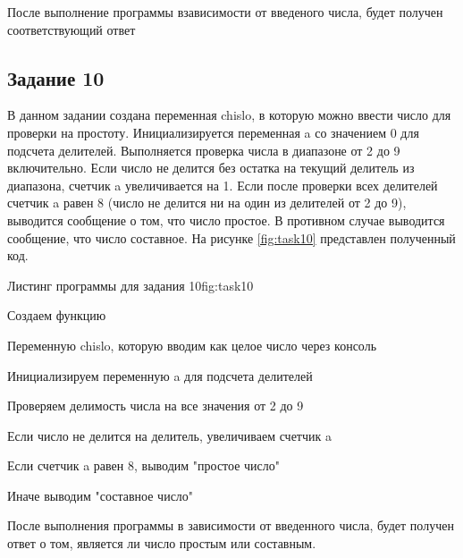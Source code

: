 \documentclass{vvsu}
\begin{document}
После выполнение программы взависимости от введеного числа, будет получен соответствующий ответ

\subsection{Задание 10}
В данном задании создана переменная chislo, в которую можно ввести число для проверки на простоту. Инициализируется переменная a со значением 0 для подсчета делителей. Выполняется проверка числа в диапазоне от 2 до 9 включительно. Если число не делится без остатка на текущий делитель из диапазона, счетчик a увеличивается на 1. Если после проверки всех делителей счетчик a равен 8 (число не делится ни на один из делителей от 2 до 9), выводится сообщение о том, что число простое. В противном случае выводится сообщение, что число составное. На рисунке \ref{fig:task10} представлен полученный код.
\begin{vvsu_figure}{Листинг программы для задания 10}{fig:task10}
    \begin{minipage}{.75\textwidth}
        
    \end{minipage}
\end{vvsu_figure}

\begin{vvsu_list}
\item Создаем функцию 
\item Переменную chislo, которую вводим как целое число через консоль
\item Инициализируем переменную a для подсчета делителей
\item Проверяем делимость числа на все значения от 2 до 9
\item Если число не делится на делитель, увеличиваем счетчик a
\item Если счетчик a равен 8, выводим "простое число"
\item Иначе выводим "составное число"
\end{vvsu_list}

После выполнения программы в зависимости от введенного числа, будет получен ответ о том, является ли число простым или составным.
\end{document}
